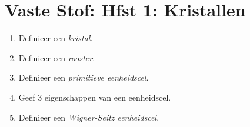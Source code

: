 \documentclass[12pt]{article}
\begin{document}
    \maketitle

    \section{Vaste Stof: Hfst 1: Kristallen}%
	\label{sec:Vaste_Stof:_Hfst_1:_Kristallen}
	
	\begin{enumerate}
		\item Definieer een \emph{kristal}.
		\item Definieer een \emph{rooster}.
		\item Definieer een \emph{primitieve eenheidscel}.
		\item Geef 3 eigenschappen van een eenheidscel.
		\item Definieer een \emph{Wigner-Seitz eenheidscel}.
	\end{enumerate}
    
\end{document}
